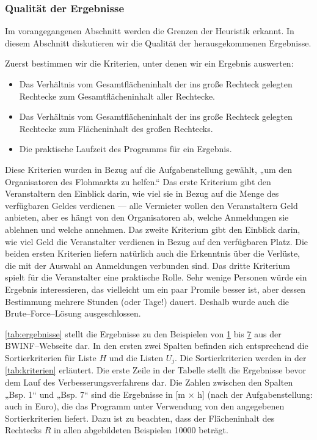 \subsubsection{Qualität der Ergebnisse}\label{sec:diskussion-ergebnisse}
Im vorangegangenen Abschnitt werden die Grenzen der Heuristik erkannt. 
In diesem Abschnitt diskutieren wir die Qualität der herausgekommenen Ergebnisse.

Zuerst bestimmen wir die Kriterien, unter denen wir ein Ergebnis auswerten:
\begin{itemize}
	\item Das Verhältnis vom Gesamtflächeninhalt der ins große Rechteck gelegten Rechtecke 
	zum Gesamtflächeninhalt aller Rechtecke.
	\item Das Verhältnis vom Gesamtflächeninhalt der ins große Rechteck gelegten Rechtecke 
	zum Flächeninhalt des großen Rechtecks.
	\item Die praktische Laufzeit des Programms für ein Ergebnis.
\end{itemize}

Diese Kriterien wurden in Bezug auf die Aufgabenstellung gewählt,
„um den Organisatoren des Flohmarkts zu helfen.“
Das erste Kriterium gibt den Veranstaltern den Einblick darin,
wie viel sie in Bezug auf die Menge des verfügbaren Geldes verdienen ---
alle Vermieter wollen den Veranstaltern Geld anbieten, aber es hängt von den 
Organisatoren ab, welche Anmeldungen sie ablehnen und welche annehmen.
Das zweite Kriterium gibt den Einblick darin, wie viel Geld die 
Veranstalter verdienen in Bezug auf den verfügbaren Platz. 
Die beiden ersten Kriterien liefern natürlich auch die Erkenntnis über die Verlüste, die 
mit der Auswahl an Anmeldungen verbunden sind.
Das dritte Kriterium spielt für die Veranstalter eine praktische Rolle.
Sehr wenige Personen würde ein Ergebnis interessieren, das vielleicht um ein paar Promile 
besser ist, aber dessen Bestimmung mehrere Stunden (oder Tage!) dauert. 
Deshalb wurde auch die Brute--Force--Lösung ausgeschlossen.

\cref{tab:ergebnisse} stellt die Ergebnisse zu den Beispielen von \hyperref[ex:1]{1} bis \hyperref[ex:7]{7}
aus der BWINF--Webseite dar.
In den ersten zwei Spalten befinden sich entsprechend die Sortierkriterien für Liste
$H$ und die Listen $U_j$. Die Sortierkriterien werden in der \cref{tab:kriterien} erläutert.
Die erste Zeile in der Tabelle stellt die Ergebnisse bevor dem Lauf des Verbesserungsverfahrens dar.
Die Zahlen zwischen den Spalten „Bsp. 1“ und „Bsp. 7“ sind die Ergebnisse in [m $\times$ h]
(nach der Aufgabenstellung: auch in Euro),
die das Programm unter Verwendung von den angegebenen Sortierkriterien liefert.
Dazu ist zu beachten, dass der Flächeninhalt des Rechtecks $R$ in allen abgebildeten Beispielen
10000 beträgt.
 
